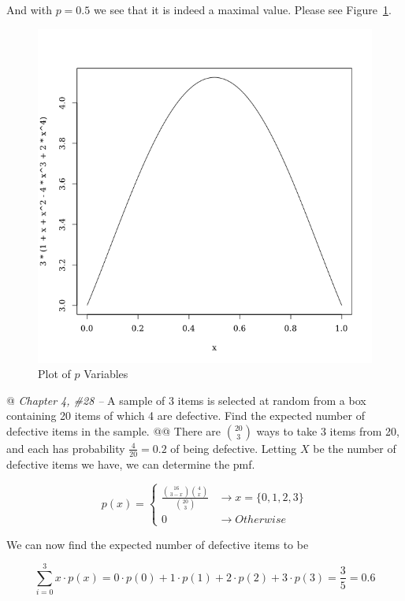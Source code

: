 \documentclass[10pt]{article}
\begin{document}
\begin{easylist}[enumerate]
    And with $p=0.5$ we see that it is indeed a maximal value. Please see Figure~\ref{fig:1.2}.

    \begin{figure}[!ht]
        \centering
        \includegraphics[scale=0.5]{./img/ps5_1_1.png}
        \caption{Plot of $p$ Variables}
        \label{fig:1.2}
    \end{figure}

    @ \textit{Chapter 4, \#28 --} A sample of 3 items is selected at random from a box containing 20 items of which 4
    are defective. Find the expected number of defective items in the sample.
    @@ There are $\binom{20}{3}$ ways to take 3 items from 20, and each has probability $\frac{4}{20} = 0.2$ of being
    defective. Letting $X$ be the number of defective items we have, we can determine the pmf.

        \[
            p(x) =
            \begin{cases}
                \frac{\binom{16}{3-x} \binom{4}{x} }{\binom{20}{3} } &\to x=\{0, 1, 2, 3\}\\
                0 &\to Otherwise
            \end{cases}
        \]

    We can now find the expected number of defective items to be

        \[
            \sum_{i=0}^3 x \cdot p(x) = 0 \cdot p(0) + 1 \cdot p(1) + 2 \cdot p(2) + 3 \cdot p(3) = \frac{3}{5} =
            \boxed{0.6}
        \]


\end{easylist}
\end{document}
